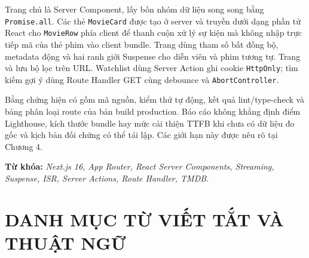 \documentclass[12pt,a4paper]{extarticle}
\begin{document}
Trang chủ là Server Component, lấy bốn nhóm dữ liệu song song bằng \texttt{Promise.all}. Các thẻ \texttt{MovieCard} được tạo ở server và truyền dưới dạng phần tử React cho \texttt{MovieRow} phía client để thanh cuộn xử lý sự kiện mà không nhập trực tiếp mã của thẻ phim vào client bundle. Trang  dùng tham số bất đồng bộ, metadata động và hai ranh giới Suspense cho diễn viên và phim tương tự. Trang  và  lưu bộ lọc trên URL. Watchlist dùng Server Action ghi cookie \texttt{HttpOnly}; tìm kiếm gợi ý dùng Route Handler GET cùng debounce và \texttt{AbortController}.

Bằng chứng hiện có gồm mã nguồn, kiểm thử tự động, kết quả lint/type-check và bảng phân loại route của bản build production. Báo cáo không khẳng định điểm Lighthouse, kích thước bundle hay mức cải thiện TTFB khi chưa có dữ liệu đo gốc và kịch bản đối chứng có thể tái lập. Các giới hạn này được nêu rõ tại Chương 4.

\vspace{0.8cm}
\noindent \textbf{Từ khóa:} \textit{Next.js 16, App Router, React Server Components, Streaming, Suspense, ISR, Server Actions, Route Handler, TMDB.}

\newpage


\tableofcontents
\newpage

\section*{DANH MỤC TỪ VIẾT TẮT VÀ THUẬT NGỮ}
{}
\end{document}
